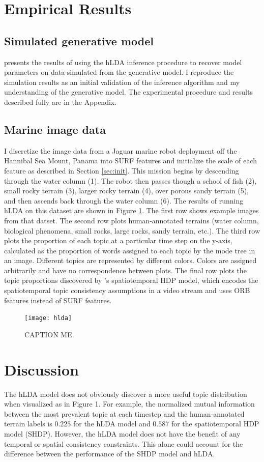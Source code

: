 \documentclass{article}
\begin{document}
\section{Empirical Results}
\label{sec:exp}


\subsection{Simulated generative model}
\cite{Blei2010} presents the results of using the hLDA inference procedure to recover model parameters on data simulated from the generative model. I reproduce the simulation results as an initial validation of the inference algorithm and my understanding of the generative model. The experimental procedure and results described fully are in the Appendix.

\subsection{Marine image data}
I discretize the image data from a Jaguar marine robot deployment off the Hannibal Sea Mount, Panama into SURF features and initialize the scale of each feature as described in Section \ref{sec:init}. This mission begins by descending through the water column (1). The robot then passes though a school of fish (2), small rocky terrain (3), larger rocky terrain (4), over porous sandy terrain (5), and then ascends back through the water column (6). The results of running hLDA on this dataset are shown in Figure \ref{fig:run12}. The first row shows example images from that datset. The second row plots human-annotated terrains (water column, biological phenomena, small rocks, large rocks, sandy terrain, etc.). The third row plots the proportion of each topic at a particular time step on the y-axis, calculated as the proportion of words assigned to each topic by the mode tree in an image. Different topics are represented by different colors.  Colors are assigned arbitrarily and have no correspondence between plots. The final row plots the topic proportions discovered by \cite{Girdhar}'s spatiotemporal HDP model, which encodes the spatiotemporal topic consistency assumptions in a video stream and uses ORB features instead of SURF features.

\begin{figure}[h]
\centering
\texttt{[image: hlda]}
\caption{CAPTION ME.}
    \label{fig:run12}
\end{figure}

\section{Discussion}
The hLDA model does not obviously discover a more useful topic distribution when visualized as in Figure 1. For example, the normalized mutual information between the most prevalent topic at each timestep and the human-annotated terrain labels is $0.225$ for the hLDA model and $0.587$ for the spatiotemporal HDP model (SHDP). However, the hLDA model does not have the benefit of any temporal or spatial consistency constraints. This alone could account for the difference between the performance of the SHDP model and hLDA.
\end{document}
